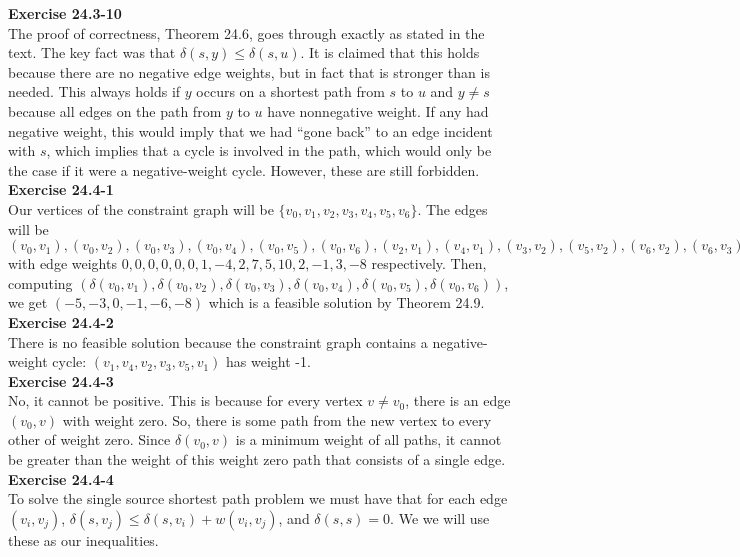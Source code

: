 \documentclass{article}
\begin{document}
\noindent\textbf{Exercise 24.3-10}\\

The proof of correctness, Theorem 24.6, goes through exactly as stated in the text.  The key fact was that $\delta(s,y) \leq \delta(s,u)$.  It is claimed that this holds because there are no negative edge weights, but in fact that is stronger than is needed.  This always holds if $y$ occurs on a shortest path from $s$ to $u$ and $y \neq s$ because all edges on the path from $y$ to $u$ have nonnegative weight.  If any had negative weight, this would imply that we had ``gone back'' to an edge incident with $s$, which implies that a cycle is involved in the path, which would only be the case if it were a negative-weight cycle.  However, these are still forbidden. \\


\noindent\textbf{Exercise 24.4-1}\\

Our vertices of the constraint graph will be $\{v_0,v_1,v_2,v_3,v_4,v_5,v_6\}$. The edges will be $(v_0,v_1),(v_0,v_2),(v_0,v_3),(v_0,v_4),(v_0,v_5),(v_0,v_6),(v_2,v_1),(v_4,v_1),(v_3,v_2),(v_5,v_2),(v_6,v_2),(v_6,v_3),(v_2,v_4),(v_1,v_5),(v_4,v_5),(v_3,v_6)$ with edge weights $0,0,0,0,0,0,1,-4,2,7,5,10,2,-1,3,-8$ respectively. Then, computing $(\delta(v_0,v_1),\delta(v_0,v_2),\delta(v_0,v_3),\delta(v_0,v_4),\delta(v_0,v_5),\delta(v_0,v_6))$, we get $(-5,-3,0,-1,-6,-8)$ which is a feasible solution by Theorem 24.9.\\

\noindent\textbf{Exercise 24.4-2}\\

There is no feasible solution because the constraint graph contains a negative-weight cycle: $(v_1, v_4, v_2, v_3, v_5, v_1)$ has weight -1. \\

\noindent\textbf{Exercise 24.4-3}\\

No, it cannot be positive. This is because for every vertex $v\neq v_0$, there is an edge $(v_0,v)$ with weight zero. So, there is some path from the new vertex to every other of weight zero. Since $\delta(v_0,v)$ is a minimum weight of all paths, it cannot be greater than the weight of this weight zero path that consists of a single edge.\\

\noindent\textbf{Exercise 24.4-4}\\

To solve the single source shortest path problem we must have that for each edge $(v_i, v_j)$, $\delta(s, v_j) \leq \delta(s,v_i) + w(v_i, v_j)$, and $\delta(s,s)  = 0$.  We we will use these as our inequalities. \\
\end{document}
